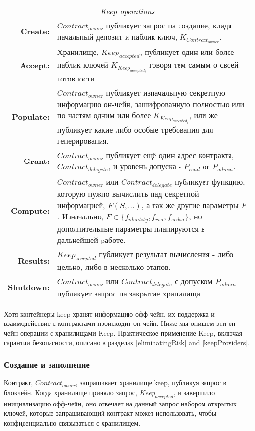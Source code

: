 \documentclass[russian,english,11pt]{article}
\begin{document}
\begin{table*}[t]
  \centering
  \begin{tabular}{|rp{10cm}|}
  \hline
  \multicolumn{2}{|c|}{\textit{Keep operations}} \\
  \textbf{Create:} & $Contract_{owner}$ публикует запрос на создание, 
  кладя начальный депозит и паблик ключ, $K_{Contract_{owner}}$.\\
  \textbf{Accept:} & Хранилище, $Keep_{accepted}$, публикует один 
  или более паблик ключей $K_{Keep_{accepted_i}}$ говоря тем самым 
  о своей готовности.\\
  \textbf{Populate:} & $Contract_{owner}$ публикует изначальную 
  секретную информацию он-чейн, зашифрованную полностью или по частям 
  одним или более $K_{Keep_{accepted_i}}$, или же публикует какие-либо 
  особые требования для генерирования.\\
  \textbf{Grant:} & $Contract_{owner}$ публикует ещё один адрес 
  контракта, $Contract_{delegate}$, и уровень допуска - 
  $P_{read}$ or $P_{admin}$.\\
  \textbf{Compute:} & $Contract_{owner}$ или $Contract_{delegate}$
  публикует функцию, которую нужно вычислить над секретной информацией, 
  $F(S,...)$, а так же другие параметры $F$. Изначально, $F {\in}
  \{f_{identity},f_{rsa},f_{ecdsa}\}$, но дополнительные параметры 
  планируются в дальнейшей pаботе.\\
  \textbf{Results:} & $Keep_{accepted}$ публикует результат 
  вычисления - либо цельно, либо в несколько этапов.\\
  \textbf{Shutdown:} & $Contract_{owner}$ или $Contract_{delegate}$
  с допуском $P_{admin}$ публикует запрос на закрытие хранилища.\\
  \hline
\end{tabular}
\end{table*}

Хотя контейнеры keep хранят информацию офф-чейн, их поддержка и 
взаимодействие с контрактами происходит он-чейн. Ниже мы опишем 
эти он-чейн операции с хранилищами Keep. Практическое применение 
Keep, включая гарантии безопасности, описано в разделах \ref{eliminatingRisk} 
and \ref{keepProviders}.

\subsubsection{Создание и заполнение}

Контракт, $Contract_{owner}$, запрашивает хранилище keep, публикуя запрос 
в блокчейн. Когда хранилище приняло запрос, $Keep_{accepted}$, и завершило 
инициализацию офф-чейн, оно отвечает на данный запрос набором открытых 
ключей, которые запрашивающий контракт может использовать, чтобы 
конфиденциально связываться с хранилищем. 
\end{document}
